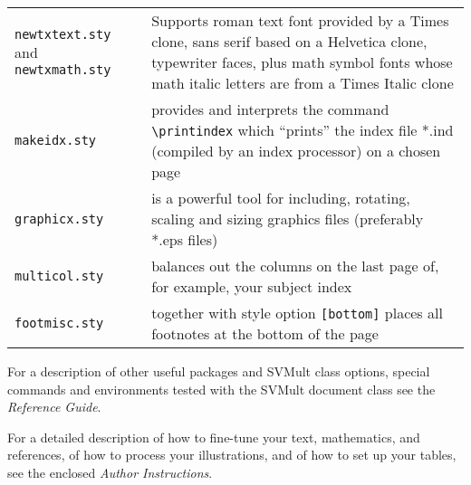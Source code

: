\documentclass[graybox]{svmult}
\begin{document}
\begin{refguide}
\begin{sloppy}
\begin{tabular}{p{7.5pc}@{\qquad}p{18.5pc}}
{\tt newtxtext.sty} and {\tt newtxmath.sty} & Supports roman text font provided by a Times clone,  sans serif based on a Helvetica clone,  typewriter faces,  plus math symbol fonts whose math italic letters are from a Times Italic clone\\
{\tt makeidx.sty} &  provides  and interprets the command  \verb|\printindex|  which ``prints'' the index file *.ind (compiled by an index processor) on a chosen page\\
{\tt graphicx.sty} & is a powerful tool for including, rotating, scaling and sizing graphics files (preferably *.eps files)\\
{\tt multicol.sty} & balances out the columns on the last page of, for example, your subject index\\
{\tt footmisc.sty}  & together with style option {\tt [bottom]} places all footnotes at the bottom of the page
\end{tabular}

For a description of other useful packages and {\sc SVMult} class options, special commands and environments tested with the {\sc SVMult} document class see the {\it Reference Guide}.



For a detailed description of how to fine-tune your text, mathematics, and references, of how to process your illustrations, and of how to set up your tables, see the enclosed {\it Author Instructions}.
\end{sloppy}

\end{refguide}
\end{document}

